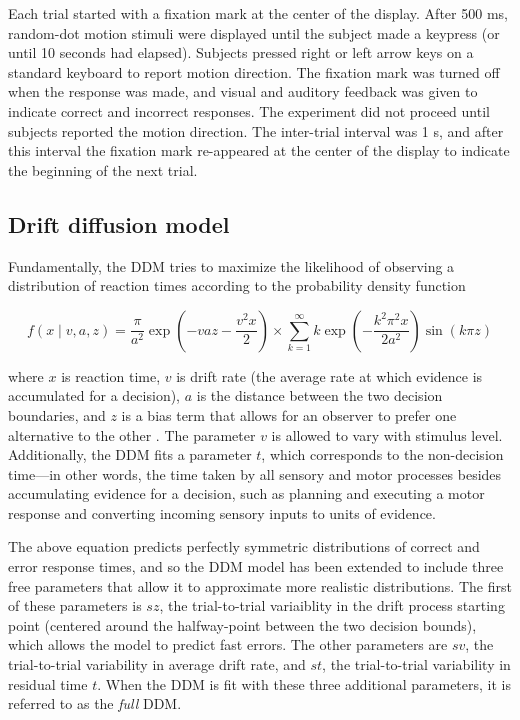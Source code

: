 \documentclass[../uwthesis.tex]{subfiles}
\begin{document}
Each trial started with a fixation mark at the center of the display. After 500 ms, random-dot motion stimuli were displayed until the subject made a keypress (or until 10 seconds had elapsed). Subjects pressed right or left arrow keys on a standard keyboard to report motion direction. The fixation mark was turned off when the response was made, and visual and auditory
feedback was given to indicate correct and incorrect responses. The experiment did not proceed until subjects reported the motion direction. The inter-trial interval was 1 s, and after this interval the fixation mark re-appeared at the center of the display to indicate the beginning of the next trial.

\subsection{Drift diffusion model}
Fundamentally, the DDM tries to maximize the likelihood of observing a distribution of reaction times according to the probability density function

\begin{equation}
f(x\mid v,a,z) = \frac{\pi}{a^2} \exp(-vaz-\frac{v^2x}{2}) \times
\sum_{k=1}^{\infty} k \exp(-\frac{k^2\pi^2x}{2a^2}) \sin(k\pi z)
\end{equation}

where $x$ is reaction time, $v$ is drift rate (the average rate at which evidence is accumulated for a decision), $a$ is the distance between the two decision boundaries, and $z$ is a bias term that allows for an observer to prefer one alternative to the other \cite{Wald1947SequentialAnalysis}. The parameter $v$ is allowed to vary with stimulus level. Additionally, the DDM fits a parameter $t$, which corresponds to the non-decision time---in other words, the time taken by all sensory and motor processes besides accumulating evidence for a decision, such as planning and executing a motor response and converting incoming sensory inputs to units of evidence.

The above equation predicts perfectly symmetric distributions of correct and error response times, and so the DDM model has been extended to include three free parameters that allow it to approximate more realistic distributions. The first of these parameters is $sz$, the trial-to-trial variaiblity in the drift process starting point (centered around the halfway-point between the two decision bounds), which allows the model to predict fast errors. The other parameters are $sv$, the trial-to-trial variability in average drift rate, and $st$, the trial-to-trial variability in residual time $t$. When the DDM is fit with these three additional parameters, it is referred to as the \textit{full} DDM.
\end{document}
